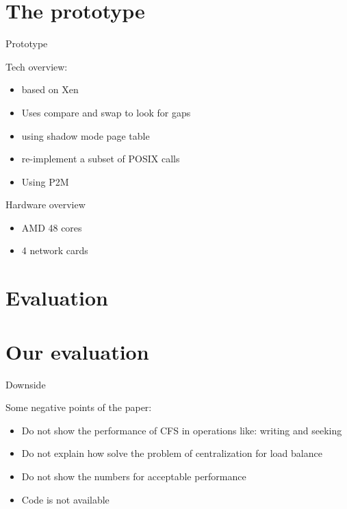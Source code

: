 \documentclass{beamer}
\begin{document}
\section{The prototype}

	\begin{frame}{Prototype}

	Tech overview:
	\begin{itemize}
	\item based on Xen
	\item Uses compare and swap to look for gaps
	\item using shadow mode page table
	\item re-implement a subset of POSIX calls
	\item Using P2M
	\end{itemize}
	
	Hardware overview
	\begin{itemize}
	\item AMD 48 cores
	\item 4 network cards
	\end{itemize}	
		
	\end{frame}

\section{Evaluation}

	
	
\section{Our evaluation}

	\begin{frame}{Downside}

	Some negative points of the paper:
	\begin{itemize}
	\item Do not show the performance of CFS in operations like: writing and seeking
	\item Do not explain how solve the problem of centralization for load balance
	\item Do not show the numbers for acceptable performance
	\item Code is not available
	\end{itemize}

	\end{frame}
\end{document}
